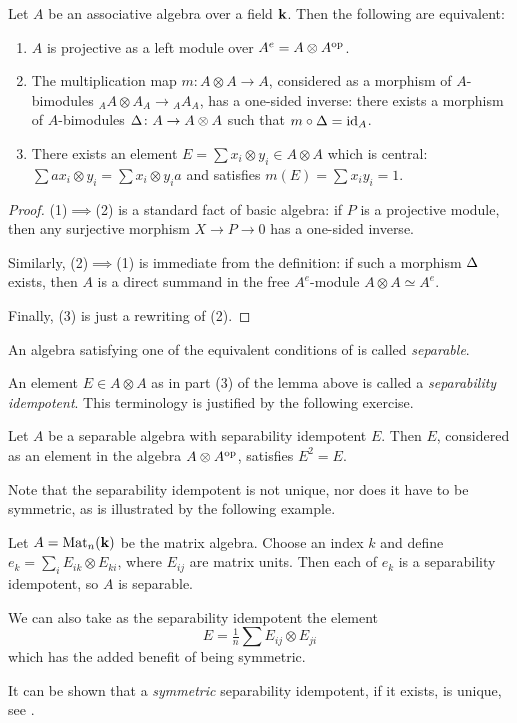 \begin{lemma}\label{l:separable}
  Let $A$ be an associative algebra over a field $\mathbf{k}$.
  Then the following are equivalent:
  \begin{enumerate}
    \item $A$ is projective as a left module over $A^e=A\otimes A^{\mathrm{op}}$.
    \item The multiplication map $m\colon A\otimes A\to A$,
      considered as a morphism of $A$-bimodules
      ${}_AA\otimes A_A \to {}_A A_A$,
      has a one-sided inverse: there exists a morphism of $A$-bimodules
      $\Delta\colon A\to A\otimes A$ such that $m\circ \Delta=\operatorname{id}_A$.
   \item There exists an element $E=\sum x_i\otimes y_i\in A\otimes A$ which
     is central: $\sum ax_i \otimes y_i=\sum x_i \otimes y_ia$ and satisfies
     $m(E)=\sum x_iy_i=1$.
   \end{enumerate}
\end{lemma}
\begin{proof}
  (1)$\implies$(2) is a standard fact of basic algebra: if $P$ is a projective
  module, then any surjective morphism $X\to P\to 0$ has a one-sided inverse.

  Similarly, (2)$\implies$(1) is immediate from the definition: if such a
  morphism $\Delta$ exists, then $A$ is a direct summand in
  the free $A^e$-module $A\otimes A\simeq A^e$.

  Finally, (3) is just a rewriting of (2).
\end{proof}
\begin{definition}\label{d:separable}
  An algebra satisfying one of the equivalent conditions of 
  is called \emph{separable}.
\end{definition}
An element $E\in A\otimes A$ as in part (3) of the lemma above is called a
\emph{separability idempotent}. This terminology
is justified by the following exercise.
\begin{exercise}\label{ec:separability-idempotent}
  Let $A$ be a separable algebra with separability idempotent $E$.
  Then $E$, considered as an element in the algebra $A\otimes A^{\mathrm{op}}$,
  satisfies $E^2=E$.
\end{exercise}


Note that the separability idempotent is not unique, nor does it have
to be symmetric, as is illustrated by the following example.
\begin{example}\label{x:matrix}
  Let $A=\operatorname{Mat}_n(\mathbf{k})$ be the matrix algebra. Choose an index $k$ and define
  $e_k=\sum_i E_{ik}\otimes E_{ki}$, where $E_{ij}$ are matrix units.
  Then each of $e_k$ is a separability idempotent, so $A$ is separable.

  We can also take as the separability idempotent the element
  $$
    E=\tfrac{1}{n}\sum E_{ij}\otimes E_{ji}
  $$
  which has the added benefit of being symmetric.
\end{example}
\begin{remark}
  It can be shown that a \emph{symmetric} separability idempotent, if it exists, is
  unique, see \cite[Theorem 3.1]{aguiar}.
\end{remark}


